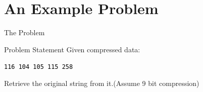 \documentclass{beamer}
\begin{document}
\section{An Example Problem}

\begin{frame}{The Problem}
    
    \begin{block}{Problem Statement}
        Given compressed data:
        
        \begin{center}
            \texttt{\textcolor{black}{116} \textcolor{black}{104} \textcolor{black}{105} \textcolor{black}{115} \textcolor{black}{258}}
        \end{center}
        
        Retrieve the original string from it.(Assume 9 bit compression)
    \end{block}
\end{frame}
\end{document}
